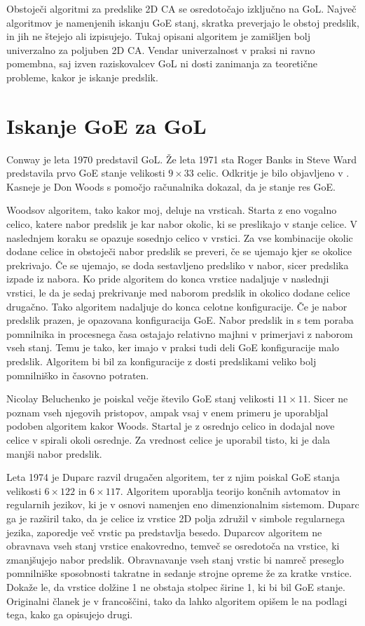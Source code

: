 \documentclass[12pt,a4paper,openany,twoside]{book}
\begin{document}
Obstoječi algoritmi za predslike 2D CA se osredotočajo izključno na GoL.
Največ algoritmov je namenjenih iskanju GoE stanj, skratka preverjajo le
obstoj predslik, in jih ne štejejo ali izpisujejo. Tukaj opisani algoritem
je zamišljen bolj univerzalno za poljuben 2D CA. Vendar univerzalnost v
praksi ni ravno pomembna, saj izven raziskovalcev GoL ni dosti zanimanja
za teoretične probleme, kakor je iskanje predslik.

\section{Iskanje GoE za GoL}

Conway je leta 1970 predstavil GoL. Že leta 1971 sta Roger Banks in Steve Ward
predstavila prvo GoE stanje velikosti \(9 \times 33\) celic.
Odkritje je bilo objavljeno v \cite{Lifeline3}. Kasneje je Don Woods
\cite{Lifeline3, Lifeline4} s pomočjo računalnika dokazal, da je stanje res GoE.

Woodsov algoritem, tako kakor moj, deluje na vrsticah.
Starta z eno vogalno celico, katere nabor predslik je kar nabor okolic,
ki se preslikajo v stanje celice. V naslednjem koraku se opazuje sosednjo celico v vrstici.
Za vse kombinacije okolic dodane celice in obstoječi nabor predslik se preveri,
če se ujemajo kjer se okolice prekrivajo. Če se ujemajo, se doda sestavljeno predsliko v nabor,
sicer predslika izpade iz nabora. Ko pride algoritem do konca vrstice nadaljuje v naslednji vrstici,
le da je sedaj prekrivanje med naborom predslik in okolico dodane celice drugačno.
Tako algoritem nadaljuje do konca celotne konfiguracije.
Če je nabor predslik prazen, je opazovana konfiguracija GoE.
Nabor predslik in s tem poraba pomnilnika in procesnega časa ostajajo
relativno majhni v primerjavi z naborom vseh stanj.
Temu je tako, ker imajo v praksi tudi deli GoE konfiguracije malo predslik.
Algoritem bi bil za konfiguracije z dosti predslikami veliko bolj pomnilniško in časovno potraten.

Nicolay Beluchenko je poiskal večje število GoE stanj velikosti \(11 \times 11\).
Sicer ne poznam vseh njegovih pristopov, ampak vsaj v enem primeru je uporabljal
podoben algoritem kakor Woods. Startal je z osrednjo celico in dodajal nove celice
v spirali okoli osrednje. Za vrednost celice je uporabil tisto, ki je dala manjši nabor predslik.

Leta 1974 je Duparc \cite{Duparc1972, Duparc1974} razvil drugačen algoritem,
ter z njim poiskal GoE stanja velikosti \(6 \times 122\) in \(6 \times 117\).
Algoritem uporablja teorijo končnih avtomatov in regularnih jezikov, ki je v
osnovi namenjen eno dimenzionalnim sistemom. Duparc ga je razširil
tako, da je celice iz vrstice 2D polja združil v simbole regularnega jezika,
zaporedje več vrstic pa predstavlja besedo.
Duparcov algoritem ne obravnava vseh stanj vrstice enakovredno,
temveč se osredotoča na vrstice, ki zmanjšujejo nabor predslik.
Obravnavanje vseh stanj vrstic bi namreč preseglo pomnilniške sposobnosti
takratne in sedanje strojne opreme že za kratke vrstice.
Dokaže le, da vrstice dolžine 1 ne obstaja stolpec širine 1, ki bi bil GoE stanje.
Originalni članek je v francoščini, tako da lahko algoritem opišem le na podlagi tega, kako ga opisujejo drugi.
\end{document}
